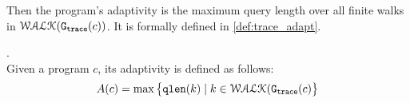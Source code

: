Then the program's adaptivity is the maximum query length over all finite walks in $\mathcal{WALK}(\mathtt{{G_{trace}}}({c}))$.
%
It is formally defined in \ref{def:trace_adapt}.
%
\begin{defn}
    .
    \label{def:trace_adapt}
    \\
    Given a program ${c}$, 
    its adaptivity is defined as follows:
    $$
    A(c) = \max \big 
    \{ \mathtt{qlen}(k) \mid k \in \mathcal{WALK}(\mathtt{{G_{trace}}}(c) \big \} 
    $$
    \end{defn}
%
